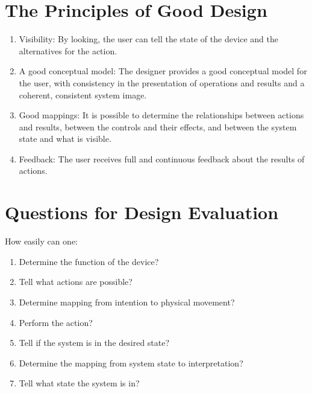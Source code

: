 \documentclass{designdoc}
\begin{document}
\section*{The Principles of Good Design}
\begin{enumerate}
\item Visibility: By looking, the user can tell the state of the device and the
  alternatives for the action.
\item A good conceptual model: The designer provides a good conceptual model
  for the user, with consistency in the presentation of operations and results
  and a coherent, consistent system image.
\item Good mappings: It is possible to determine the relationships between
  actions and results, between the controls and their effects, and between the
  system state and what is visible.
\item Feedback: The user receives full and continuous feedback about the
  results of actions.
\end{enumerate}

\section*{Questions for Design Evaluation}
How easily can one:
\begin{enumerate}
\item Determine the function of the device?
\item Tell what actions are possible?
\item Determine mapping from intention to physical movement?
\item Perform the action?
\item Tell if the system is in the desired state?
\item Determine the mapping from system state to interpretation?
\item Tell what state the system is in?
\end{enumerate}
\end{document}

